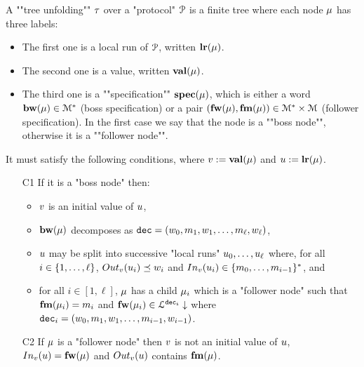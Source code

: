 \begin{definition}
	\label{def:tree-unfolding}
	A ""tree unfolding"" $\tau$ over a "protocol" $\mathcal{P}$ is
	a finite tree where each node $\mu$ has three labels:
	\begin{itemize}
		\item The first one is a local run of $\mathcal{P}$, written $\mathbf{lr}(\mu)$. 
		
		\item The second one is a value, written $\mathbf{val}(\mu)$.
		
		\item The third one is a ""specification"" $\mathbf{spec}(\mu)$, which is either a word $\mathbf{bw}(\mu) \in \mathcal{M}^*$ (boss specification) or a pair $(\mathbf{fw}(\mu), \mathbf{fm}(\mu)) \in \mathcal{M}^* \times \mathcal{M}$ (follower specification). In the first case we say that the node is a ""boss node"", otherwise it is a ""follower node"".
	\end{itemize} 
	
	It must satisfy the following conditions, where $v := \mathbf{val}(\mu)$ and $u := \mathbf{lr}(\mu)$.

	\begin{itemize}
		\item[C1\namedlabel{unfoldingC1}{C1}] If it is a "boss node" then:
		\begin{itemize} 
			\item $v$ is an initial value of $u$, 
			\item $\mathbf{bw}(\mu)$ decomposes as $\mathtt{dec} = (w_0, m_1, w_1, \ldots, m_{\ell}, w_{\ell})$, 
			\item $u$ may be split into successive "local runs" $u_0, \dots, u_{\ell}$ where, for all $i \in \{1,\dots,\ell\}$, $\voutput{\aval}{\localrun_i} \subword w_i$ and $\vinput{\aval}{\localrun_i} \in \set{m_0, \dots, m_{i-1}}^*$, and
			\item  for all $i \in [1,\ell]$, $\mu$ has a child $\mu_i$ which is a "follower node" such that $\mathbf{fm}(\mu_i) = m_i$ and $\mathbf{fw}(\mu_i) \in\mathcal{L}^{\mathtt{\mathtt{dec}_i}}\downarrow$ where $\mathtt{dec}_i = (w_0, m_1, w_1, \ldots, m_{i-1}, w_{i-1})$.
		\end{itemize}
		\item[C2\namedlabel{unfoldingC2}{C2}] If $\mu$ is a "follower node" then $v$ is not an initial value of $u$, $\vinput{\aval}{\localrun} = \followlabelword{\node}$ and 
		$\voutput{\aval}{\localrun}$ contains $\mathbf{fm}(\mu)$.
		

\end{itemize}
\end{definition}
